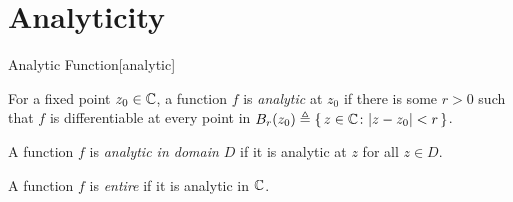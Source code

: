 \documentclass[../complex_variables_1.tex]{subfiles}
\begin{document}
\section{Analyticity}

\begin{Definition}{Analytic Function}[analytic]
\begin{itemize}
    \ii
    For a fixed point \(z_0 \in \CC\),
    a function \(f\) is \emph{analytic} at \(z_0\)
    if there is some \(r > 0\) such that
    \(f\) is differentiable at every point in
    \(B_r(z_0) \triangleq \{\,z \in \CC \colon |z - z_0| < r\,\}\).

    \ii
    A function \(f\) is \emph{analytic in domain \(D\)}
    if it is analytic at \(z\) for all \(z \in D\).

    \ii
    A function \(f\) is \emph{entire} if it is analytic in \(\CC\).
\end{itemize}
\end{Definition}
\end{document}
